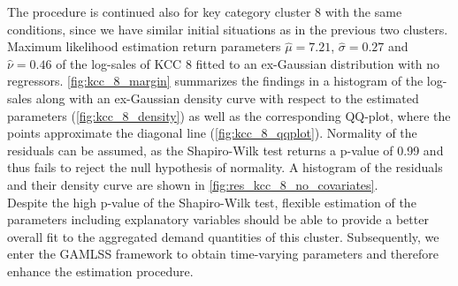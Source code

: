 
The procedure is continued also for key category cluster 8 with the same conditions, since we have similar initial situations as in the previous two clusters.
\\

Maximum likelihood estimation return parameters $\hat{\mu} = 7.21$, $\hat{\sigma} = 0.27$ and $\hat{\nu} = 0.46$ of the log-sales of \ac{KCC} 8 fitted to an ex-Gaussian distribution with no regressors.
\autoref{fig:kcc_8_margin} summarizes the findings in a histogram of the log-sales along with an ex-Gaussian density curve with respect to the estimated parameters (\autoref{fig:kcc_8_density}) as well as the corresponding QQ-plot, where the points approximate the diagonal line (\autoref{fig:kcc_8_qqplot}). Normality of the residuals can be assumed, as the Shapiro-Wilk test returns a p-value of 0.99 and thus fails to reject the null hypothesis of normality. A histogram of the residuals and their density curve are shown in \autoref{fig:res_kcc_8_no_covariates}.\\
 Despite the high p-value of the Shapiro-Wilk test, flexible estimation of the parameters including explanatory variables should be able to provide a better overall fit to the aggregated demand quantities of this cluster. Subsequently, we enter the \ac{GAMLSS} framework to obtain time-varying parameters and therefore enhance the estimation procedure.
\\


%




